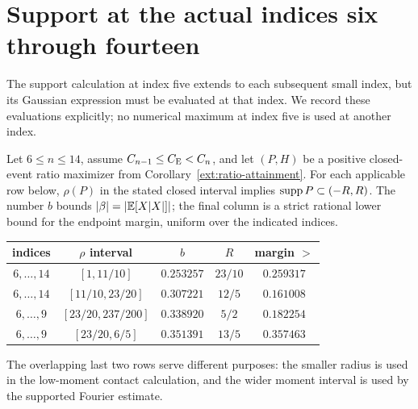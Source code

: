 \section{Support at the actual indices six through fourteen}
\label{ext:support6-14}
The support calculation at index five extends to each subsequent small
index, but its Gaussian expression must be evaluated at that index. We
record these evaluations explicitly; no numerical maximum at index five
is used at another index.

\begin{proposition}
\label{ext:support6-14-table}
Let $6\le n\le14$, assume $C_{n-1}\le C_{\mathrm E}<C_n$, and let $(P,H)$ be
a positive closed-event ratio maximizer from
Corollary~\ref{ext:ratio-attainment}. For each applicable row below,
$\rho(P)$ in the stated closed interval implies
$\operatorname{supp} P\subset(-R,R)$. The number $b$ bounds
$|\beta|=|\mathbb E[X|X|]|$; the final column is a strict rational lower
bound for the endpoint margin, uniform over the indicated indices.
\begin{center}\small
\begin{tabular}{@{}ccccc@{}}
\toprule
indices & $\rho$ interval & $b$ & $R$ & margin $>$\\
\midrule
$6,\ldots,14$ & $[1,11/10]$ & $0.253257$ & $23/10$ & $0.259317$\\
$6,\ldots,14$ & $[11/10,23/20]$ & $0.307221$ & $12/5$ & $0.161008$\\
$6,\ldots,9$ & $[23/20,237/200]$ & $0.338920$ & $5/2$ & $0.182254$\\
$6,\ldots,9$ & $[23/20,6/5]$ & $0.351391$ & $13/5$ & $0.357463$\\
\bottomrule
\end{tabular}
\end{center}
The overlapping last two rows serve different purposes: the smaller
radius is used in the low-moment contact calculation, and the wider
moment interval is used by the supported Fourier estimate.
\end{proposition}

